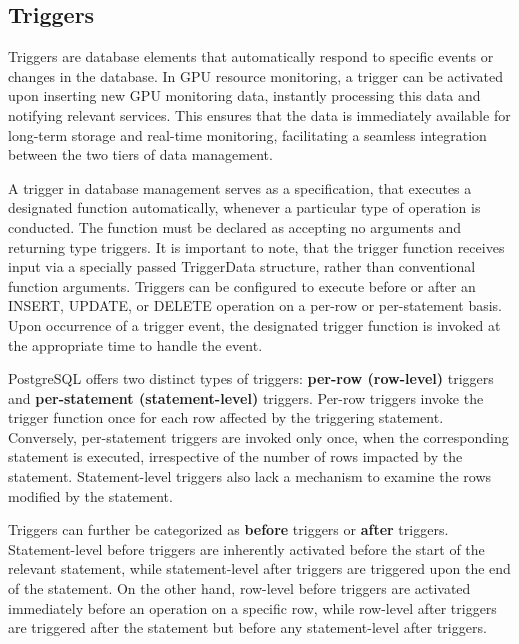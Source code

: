 \subsection{Triggers}

Triggers \cite{Shaik2023triggers, postgresql-doc} are database elements that automatically respond to specific events or changes in the database. In GPU resource monitoring, a trigger can be activated upon inserting new GPU monitoring data, instantly processing this data and notifying relevant services. This ensures that the data is immediately available for long-term storage and real-time monitoring, facilitating a seamless integration between the two tiers of data management.


A trigger in database management serves as a specification, that executes a designated function automatically, whenever a particular type of operation is conducted. The function must be declared as accepting no arguments and returning type triggers. It is important to note, that the trigger function receives input via a specially passed TriggerData structure, rather than conventional function arguments. Triggers can be configured to execute before or after an INSERT, UPDATE, or DELETE operation on a per-row or per-statement basis. Upon occurrence of a trigger event, the designated trigger function is invoked at the appropriate time to handle the event.

PostgreSQL offers two distinct types of triggers: \textbf{per-row (row-level)} triggers and \textbf{per-statement (statement-level)} triggers. Per-row triggers invoke the trigger function once for each row affected by the triggering statement. Conversely, per-statement triggers are invoked only once, when the corresponding statement is executed, irrespective of the number of rows impacted by the statement. Statement-level triggers also lack a mechanism to examine the rows modified by the statement.

Triggers can further be categorized as \textbf{before} triggers or \textbf{after} triggers. Statement-level before triggers are inherently activated before the start of the relevant statement, while statement-level after triggers are triggered upon the end of the statement. On the other hand, row-level before triggers are activated immediately before an operation on a specific row, while row-level after triggers are triggered after the statement but before any statement-level after triggers.

